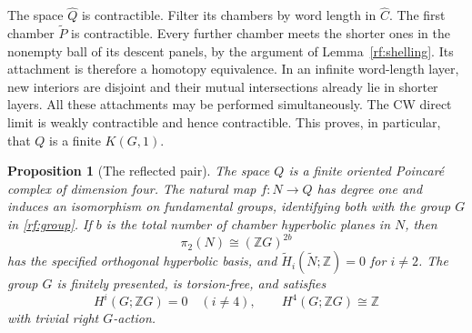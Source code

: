 \documentclass[11pt]{article}
\newtheorem{proposition}[theorem]{Proposition}
\theoremstyle{definition}
\theoremstyle{remark}
\newcommand{\Z}{\mathbb Z}
\begin{document}
The space $\widehat Q$ is contractible.  Filter its chambers by word
length in $\widehat C$.  The first chamber $\widetilde P$ is
contractible.  Every further chamber meets the shorter ones in the
nonempty ball of its descent panels, by the argument of
Lemma~\ref{rf:shelling}.  Its attachment is therefore a homotopy
equivalence.  In an infinite word-length layer, new interiors are
disjoint and their mutual intersections already lie in shorter layers.
All these attachments may be performed simultaneously.  The CW
direct limit is weakly contractible and hence contractible.  This
proves, in particular, that $Q$ is a finite $K(G,1)$.

\begin{proposition}[The reflected pair]
\label{rf:development}
The space $Q$ is a finite oriented Poincar\'e complex of dimension four.
The natural map $f:N\to Q$ has degree one and induces an isomorphism
on fundamental groups, identifying both with the group $G$ in
\eqref{rf:group}.  If $b$ is the total number of chamber hyperbolic
planes in $N$, then
\[
 \pi_2(N)\cong(\Z G)^{2b}
\]
has the specified orthogonal hyperbolic basis, and
$\widetilde H_i(\widetilde N;\Z)=0$ for $i\ne2$.
The group $G$ is finitely presented, is torsion-free, and satisfies
\begin{equation}
 \label{rf:pd}
 H^i(G;\Z G)=0\quad(i\ne4),\qquad
 H^4(G;\Z G)\cong\Z
\end{equation}
with trivial right $G$-action.
\end{proposition}
\end{document}
